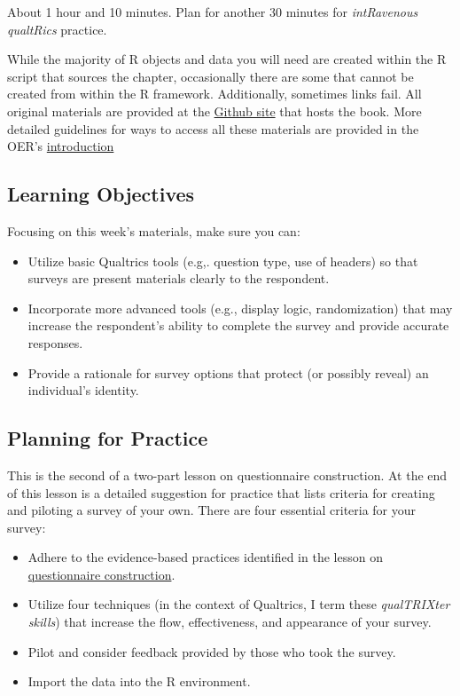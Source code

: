 \documentclass[
  english,
]{book}
\providecommand{\tightlist}{%
  \setlength{\itemsep}{0pt}\setlength{\parskip}{0pt}}
\begin{document}
About 1 hour and 10 minutes. Plan for another 30 minutes for \emph{intRavenous qualtRics} practice.

While the majority of R objects and data you will need are created within the R script that sources the chapter, occasionally there are some that cannot be created from within the R framework. Additionally, sometimes links fail. All original materials are provided at the \href{https://github.com/lhbikos/ReC_Psychometrics}{Github site} that hosts the book. More detailed guidelines for ways to access all these materials are provided in the OER's \protect\hyperlink{ReCintro}{introduction}

\hypertarget{learning-objectives-1}{%
\subsection{Learning Objectives}\label{learning-objectives-1}}

Focusing on this week's materials, make sure you can:

\begin{itemize}
\tightlist
\item
  Utilize basic Qualtrics tools (e.g,. question type, use of headers) so that surveys are present materials clearly to the respondent.
\item
  Incorporate more advanced tools (e.g., display logic, randomization) that may increase the respondent's ability to complete the survey and provide accurate responses.
\item
  Provide a rationale for survey options that protect (or possibly reveal) an individual's identity.
\end{itemize}

\hypertarget{planning-for-practice-1}{%
\subsection{Planning for Practice}\label{planning-for-practice-1}}

This is the second of a two-part lesson on questionnaire construction. At the end of this lesson is a detailed suggestion for practice that lists criteria for creating and piloting a survey of your own. There are four essential criteria for your survey:

\begin{itemize}
\tightlist
\item
  Adhere to the evidence-based practices identified in the lesson on \protect\hyperlink{QuestCon}{questionnaire construction}.
\item
  Utilize four techniques (in the context of Qualtrics, I term these \emph{qualTRIXter skills}) that increase the flow, effectiveness, and appearance of your survey.
\item
  Pilot and consider feedback provided by those who took the survey.
\item
  Import the data into the R environment.
\end{itemize}
\end{document}
